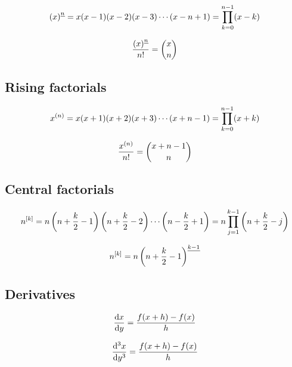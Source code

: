 \begin{proposition}
  \begin{align*}
    \left(x \right)^{\underline{n}} = x(x-1)(x-2)(x-3)\cdots(x-n+1) = \prod_{k=0}^{n-1}(x-k)
  \end{align*}
\end{proposition}

\begin{proposition}
  \begin{align*}
    \frac{\left(x \right)^{\underline{n}}}{n!} = \binom{x}{n}
  \end{align*}
\end{proposition}

\subsection{Rising factorials}
\begin{proposition} 
  \begin{align*}
    x^{\left(n\right)} = x(x+1)(x+2)(x+3)\cdots(x+n-1) = \prod_{k=0}^{n-1}(x+k)
  \end{align*}
\end{proposition}

\begin{proposition}
  \begin{align*}
    \frac{x^{\left(n\right)}}{n!} = \binom{x+n-1}{n}
  \end{align*}
\end{proposition}

\subsection{Central factorials}
\begin{lemma}
  \begin{align*}
    n^{[k]}
    = n \left( n + \frac{k}{2} -1 \right)\left( n + \frac{k}{2} -2 \right) \cdots \left( n - \frac{k}{2} +1 \right)
    = n \prod_{j=1}^{k-1} \left( n + \frac{k}{2} -j \right)
  \end{align*}
\end{lemma}

\begin{proposition}
  \begin{align*}
    n^{[k]} = n \left(n+\frac{k}{2}-1 \right)^{\underline{k-1}}
  \end{align*}
\end{proposition}

\subsection{Derivatives}

\begin{align*}
  \frac{\mathrm{d} x}{\mathrm{d} y} = \frac{f(x+h)-f(x)}{h}
\end{align*}

\begin{align*}
  \frac{\mathrm{d}^{3} x}{\mathrm{d} y^{3}} = \frac{f(x+h)-f(x)}{h}
\end{align*}
